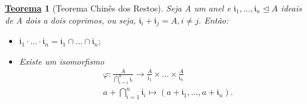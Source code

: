\documentclass{article}
\newtheorem*{theorem*}{\underline{Teorema}}
\begin{document}
    \hypertarget{chinese_remainder}{
      \begin{theorem*}[Teorema Chinês dos Restos]
        Seja A um anel e \(\mathfrak{i}_{1},\dotsc,\mathfrak{i}_{n}\trianglelefteq{A}\) ideais de A dois a dois coprimos, ou seja,
        \(\mathfrak{i}_{i}+\mathfrak{i}_{j}=A, i\neq j.\) Então:
        \begin{itemize}
          \item[1)] \(\mathfrak{i}_{1}\cdot \dotsc \cdot \mathfrak{i}_{n} = \mathfrak{i}_{1}\cap \dotsc\cap \mathfrak{i}_{n};\)
          \item[2)] Existe um isomorfismo 
            \begin{align*}
  &\varphi :\frac{A}{\bigcap_{i=1}^{n}\mathfrak{i}_{i}}\rightarrow \frac{A}{\mathfrak{i}_{1}}\times \dotsc\times \frac{A}{\mathfrak{i}_{n}}\\
  &a+\bigcap_{i=1}^{n}\mathfrak{i}_{i}\mapsto(a+\mathfrak{i}_{1}, \dotsc, a+\mathfrak{i}_{n}).
            \end{align*}
        \end{itemize} 
    \end{theorem*}}
\end{document}
